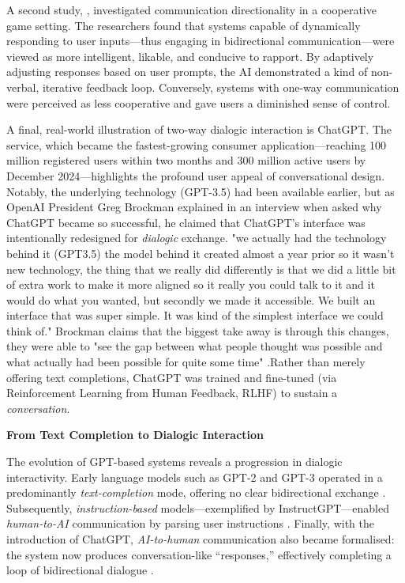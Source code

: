 A second study, \cite{Ashktorab2021-ie}, investigated communication directionality in a cooperative game setting. The researchers found that systems capable of dynamically responding to user inputs—thus engaging in bidirectional communication—were viewed as more intelligent, likable, and conducive to rapport. By adaptively adjusting responses based on user prompts, the AI demonstrated a kind of non-verbal, iterative feedback loop. Conversely, systems with one-way communication were perceived as less cooperative and gave users a diminished sense of control.

A final, real-world illustration of two-way dialogic interaction is ChatGPT. The service, which became the fastest-growing consumer application—reaching 100 million registered users within two months and 300 million active users by December 2024—highlights the profound user appeal of conversational design. Notably, the underlying technology (GPT-3.5) had been available earlier, but as OpenAI President Greg Brockman explained in an interview when asked why ChatGPT became so successful, he claimed that ChatGPT’s interface was intentionally redesigned for \textit{dialogic} exchange. "we actually had the technology behind it (GPT3.5) the model behind it created almost a year prior so it wasn't new technology, the thing that we really did differently is that we did a little bit of extra work to make it more aligned so it really you could talk to it and it would do what you wanted, but secondly we made it accessible. We built an interface that was super simple. It was kind of the simplest interface we could think of." Brockman claims that the biggest take away is through this changes, they were able to "see the gap between what people thought was possible and what actually had been possible for quite some time" \cite{SXSW2023-wg}.Rather than merely offering text completions, ChatGPT was trained and fine-tuned (via Reinforcement Learning from Human Feedback, RLHF) to sustain a \textit{conversation}. 

\textbf{From Text Completion to Dialogic Interaction}

The evolution of GPT-based systems reveals a progression in dialogic interactivity. Early language models such as GPT-2 and GPT-3 operated in a predominantly \textit{text-completion} mode, offering no clear bidirectional exchange \cite{Brown2020-js}. Subsequently, \textit{instruction-based} models—exemplified by InstructGPT—enabled \textit{human-to-AI} communication by parsing user instructions \cite{OpenAI2022-pj}. Finally, with the introduction of ChatGPT, \textit{AI-to-human} communication also became formalised: the system now produces conversation-like “responses,” effectively completing a loop of bidirectional dialogue \cite{OpenAI2022-wx}.

